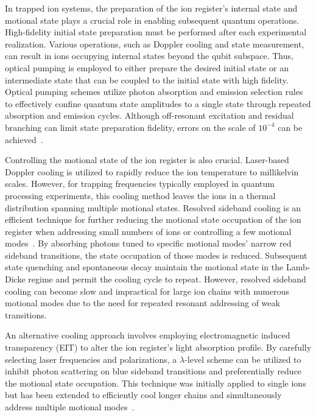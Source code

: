 \documentclass[
  journal=largetwo,
  year=2023,
]{cup-journal}
\begin{document}
In trapped ion systems, the preparation of the ion register's internal state and motional state plays a crucial role in enabling subsequent quantum operations. High-fidelity initial state preparation must be performed after each experimental realization. Various operations, such as Doppler cooling and state measurement, can result in ions occupying internal states beyond the qubit subspace. Thus, optical pumping is employed to either prepare the desired initial state or an intermediate state that can be coupled to the initial state with high fidelity. Optical pumping schemes utilize photon absorption and emission selection rules to effectively confine quantum state amplitudes to a single state through repeated absorption and emission cycles. Although off-resonant excitation and residual branching can limit state preparation fidelity, errors on the scale of \(10^{-4}\) can be achieved~\autocite{harty_2014_highfidelity}.

Controlling the motional state of the ion register is also crucial. Laser-based Doppler cooling is utilized to rapidly reduce the ion temperature to millikelvin scales. However, for trapping frequencies typically employed in quantum processing experiments, this cooling method leaves the ions in a thermal distribution spanning multiple motional states. Resolved sideband cooling is an efficient technique for further reducing the motional state occupation of the ion register when addressing small numbers of ions or controlling a few motional modes~\autocite{monroe_1995_demonstration}. By absorbing photons tuned to specific motional modes' narrow red sideband transitions, the state occupation of those modes is reduced. Subsequent state quenching and spontaneous decay maintain the motional state in the Lamb-Dicke regime and permit the cooling cycle to repeat. However, resolved sideband cooling can become slow and impractical for large ion chains with numerous motional modes due to the need for repeated resonant addressing of weak transitions.

An alternative cooling approach involves employing electromagnetic induced transparency (EIT) to alter the ion register's light absorption profile. By carefully selecting laser frequencies and polarizations, a \( \lambda \)-level scheme can be utilized to inhibit photon scattering on blue sideband transitions and preferentially reduce the motional state occupation. This technique was initially applied to single ions but has been extended to efficiently cool longer chains and simultaneously address multiple motional modes~\autocite{lechner_2016_electromagneticallyinducedtransparency}.
\end{document}
